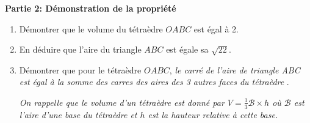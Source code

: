 \medskip

\textbf{Partie 2: Démonstration de la propriété}

\smallskip

\begin{enumerate}
	\item Démontrer que le volume du tétraèdre $OABC$ est égal à 2.
	\item En déduire que l'aire du triangle $ABC$ est égale sa $\sqrt{22}$.
	\item Démontrer que pour le tétraèdre $OABC$, \emph{\og le carré de l'aire de triangle \emph{ABC} est égal à la somme des carres des aires des 3 autres faces du tétraèdre \fg}.
	
	\medskip
	
	\textit{On rappelle que le volume d'un tétraèdre est donné par $V=\frac{1}{3} \mathcal{B} \times h$ où $\mathcal{B}$ est l'aire d'une base du tétraèdre et $h$ est la hauteur relative à cette base.}
\end{enumerate}